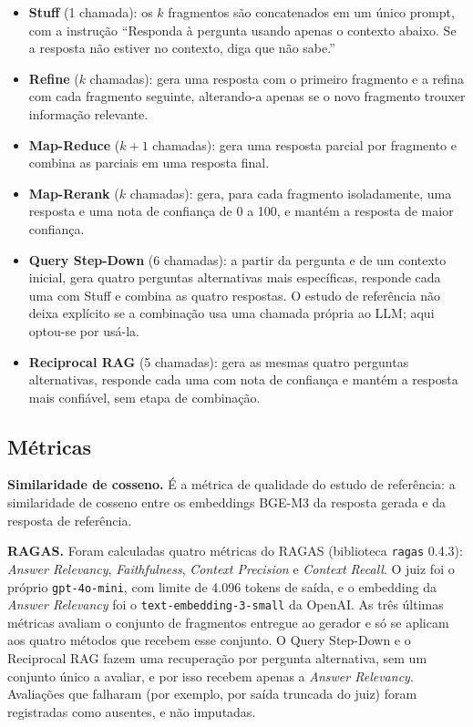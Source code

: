 \begin{itemize}
  \item \textbf{Stuff} (1 chamada): os $k$ fragmentos são concatenados em um único prompt, com a instrução ``Responda à pergunta usando apenas o contexto abaixo. Se a resposta não estiver no contexto, diga que não sabe.''
  \item \textbf{Refine} ($k$ chamadas): gera uma resposta com o primeiro fragmento e a refina com cada fragmento seguinte, alterando-a apenas se o novo fragmento trouxer informação relevante.
  \item \textbf{Map-Reduce} ($k+1$ chamadas): gera uma resposta parcial por fragmento e combina as parciais em uma resposta final.
  \item \textbf{Map-Rerank} ($k$ chamadas): gera, para cada fragmento isoladamente, uma resposta e uma nota de confiança de 0 a 100, e mantém a resposta de maior confiança.
  \item \textbf{Query Step-Down} (6 chamadas): a partir da pergunta e de um contexto inicial, gera quatro perguntas alternativas mais específicas, responde cada uma com Stuff e combina as quatro respostas. O estudo de referência não deixa explícito se a combinação usa uma chamada própria ao LLM; aqui optou-se por usá-la.
  \item \textbf{Reciprocal RAG} (5 chamadas): gera as mesmas quatro perguntas alternativas, responde cada uma com nota de confiança e mantém a resposta mais confiável, sem etapa de combinação.
\end{itemize}

\subsection{Métricas}

\textbf{Similaridade de cosseno.} É a métrica de qualidade do estudo de referência: a similaridade de cosseno entre os embeddings BGE-M3 da resposta gerada e da resposta de referência.

\textbf{RAGAS.} Foram calculadas quatro métricas do RAGAS \cite{es2024ragas} (biblioteca \texttt{ragas} 0.4.3): \emph{Answer Relevancy}, \emph{Faithfulness}, \emph{Context Precision} e \emph{Context Recall}. O juiz foi o próprio \texttt{gpt-4o-mini}, com limite de 4.096 tokens de saída, e o embedding da \emph{Answer Relevancy} foi o \texttt{text-embedding-3-small} da OpenAI. As três últimas métricas avaliam o conjunto de fragmentos entregue ao gerador e só se aplicam aos quatro métodos que recebem esse conjunto. O Query Step-Down e o Reciprocal RAG fazem uma recuperação por pergunta alternativa, sem um conjunto único a avaliar, e por isso recebem apenas a \emph{Answer Relevancy}. Avaliações que falharam (por exemplo, por saída truncada do juiz) foram registradas como ausentes, e não imputadas.

